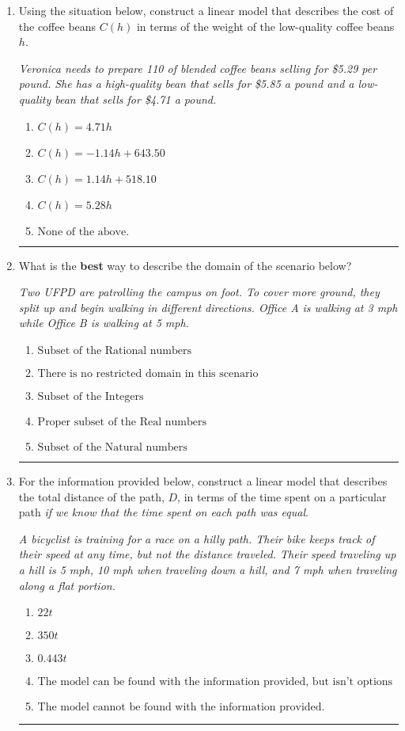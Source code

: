 \documentclass[14pt]{extbook}
\newcommand{\litem}[1]{\item#1\hspace*{-1cm}\rule{\textwidth}{0.4pt}}
\begin{document}
\begin{enumerate}
{\begin{enumerate}[label=\Alph*.]
\end{enumerate} }
\litem{
Using the situation below, construct a linear model that describes the cost of the coffee beans $C(h)$ in terms of the weight of the low-quality coffee beans $h$.
\begin{center}
    \textit{ Veronica needs to prepare 110 of blended coffee beans selling for \$5.29 per pound. She has a high-quality bean that sells for \$5.85 a pound and a low-quality bean that sells for \$4.71 a pound. }
\end{center}
\begin{enumerate}[label=\Alph*.]
\item \( C(h) = 4.71 h \)
\item \( C(h) = -1.14 h + 643.50 \)
\item \( C(h) = 1.14 h + 518.10 \)
\item \( C(h) = 5.28 h \)
\item \( \text{None of the above.} \)

\end{enumerate} }
\litem{
What is the \textbf{best} way to describe the domain of the scenario below?
\begin{center}
    \textit{ Two UFPD are patrolling the campus on foot. To cover more ground, they split up and begin walking in different directions. Office A is walking at 3 mph while Office B is walking at 5 mph. }
\end{center}
\begin{enumerate}[label=\Alph*.]
\item \( \text{Subset of the Rational numbers} \)
\item \( \text{There is no restricted domain in this scenario} \)
\item \( \text{Subset of the Integers} \)
\item \( \text{Proper subset of the Real numbers} \)
\item \( \text{Subset of the Natural numbers} \)

\end{enumerate} }
\litem{
For the information provided below, construct a linear model that describes the total distance of the path, $D$, in terms of the time spent on a particular path \textit{if we know that the time spent on each path was equal}.
\begin{center}
    \textit{ A bicyclist is training for a race on a hilly path. Their bike keeps track of their speed at any time, but not the distance traveled. Their speed traveling up a hill is 5 mph, 10 mph when traveling down a hill, and 7 mph when traveling along a flat portion. }
\end{center}
\begin{enumerate}[label=\Alph*.]
\item \( 22 t \)
\item \( 350 t \)
\item \( 0.443 t \)
\item \( \text{The model can be found with the information provided, but isn't options 1-3.} \)
\item \( \text{The model cannot be found with the information provided.} \)


\end{enumerate}}
\end{enumerate}
\end{document}
